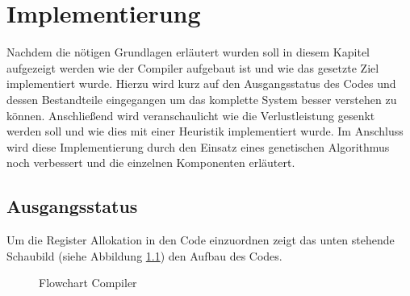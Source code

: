 \chapter{Implementierung}
\label{chap:Implementierung}
Nachdem die nötigen Grundlagen erläutert wurden soll in diesem Kapitel aufgezeigt werden wie der Compiler aufgebaut ist und wie das gesetzte Ziel implementiert wurde. Hierzu wird kurz auf den Ausgangsstatus des Codes und dessen Bestandteile eingegangen um das komplette System besser verstehen zu können. Anschließend wird veranschaulicht wie die Verlustleistung gesenkt werden soll und wie dies mit einer Heuristik implementiert wurde. Im Anschluss wird diese Implementierung durch den Einsatz eines genetischen Algorithmus noch verbessert und die einzelnen Komponenten erläutert.
\section{Ausgangsstatus}
Um die Register Allokation in den Code einzuordnen zeigt das unten stehende Schaubild (siehe Abbildung \ref{fig:flow_compiler}) den Aufbau des Codes.

\begin{figure}[htbp] 
	\centering
	
	\caption{Flowchart Compiler}
	\label{fig:flow_compiler}
\end{figure}

